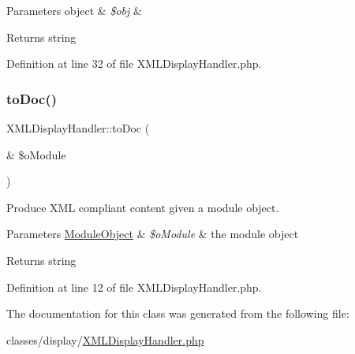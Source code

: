 \begin{DoxyParams}[1]{Parameters}
object & {\em \$obj} & \\
\hline
\end{DoxyParams}
\begin{DoxyReturn}{Returns}
string 
\end{DoxyReturn}


Definition at line 32 of file X\+M\+L\+Display\+Handler.\+php.

\hypertarget{classXMLDisplayHandler_adebe0869fea845f4007acc2b84e2d24c}{}\label{classXMLDisplayHandler_adebe0869fea845f4007acc2b84e2d24c} 
\subsubsection{\texorpdfstring{to\+Doc()}{toDoc()}}
{\footnotesize\ttfamily X\+M\+L\+Display\+Handler\+::to\+Doc (\begin{DoxyParamCaption}\item[{\&}]{\$o\+Module }\end{DoxyParamCaption})}

Produce X\+ML compliant content given a module object.~\newline

\begin{DoxyParams}[1]{Parameters}
\hyperlink{classModuleObject}{Module\+Object} & {\em \$o\+Module} & the module object \\
\hline
\end{DoxyParams}
\begin{DoxyReturn}{Returns}
string 
\end{DoxyReturn}


Definition at line 12 of file X\+M\+L\+Display\+Handler.\+php.



The documentation for this class was generated from the following file\+:\begin{DoxyCompactItemize}
\item 
classes/display/\hyperlink{XMLDisplayHandler_8php}{X\+M\+L\+Display\+Handler.\+php}\end{DoxyCompactItemize}
